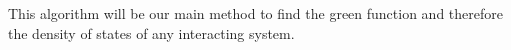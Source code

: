 This algorithm will be our main method to find the green function and therefore the density of states of any interacting system. 













